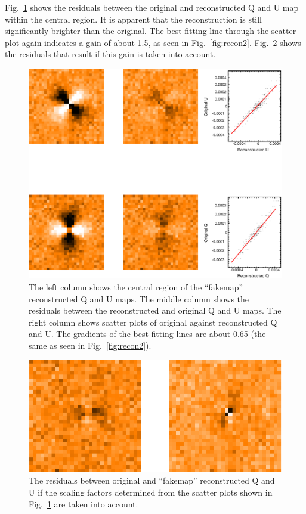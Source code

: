 \documentclass[twoside,11pt]{starlink}
\begin{document}
Fig.~\ref{fig:recon2b} shows the residuals between the original and
reconstructed Q and U map within the central region. It is apparent that
the reconstruction is still significantly brighter than the original. The best
fitting line through the scatter plot again indicates a gain of about 1.5,
as seen in Fig.~\ref{fig:recon2}. Fig.~\ref{fig:recon3b} shows the residuals
that result if this gain is taken into account.

\begin{figure}
\includegraphics[width=\columnwidth]{recon2b}
\caption{The left column shows the central region of the ``fakemap''
reconstructed Q and U maps. The middle column shows the residuals between
the reconstructed and original Q and U maps. The right column shows
scatter plots of original against reconstructed Q and U. The gradients of
the best fitting lines are about 0.65 (the same as seen in
Fig.~\ref{fig:recon2}).}
\label{fig:recon2b}
\end{figure}

\begin{figure}
\includegraphics[width=\columnwidth]{recon3b}
\caption{The residuals between original and ``fakemap'' reconstructed Q
and U if the scaling factors determined from the scatter plots shown in
Fig.~\ref{fig:recon2b} are taken into account.}
\label{fig:recon3b}
\end{figure}
\end{document}
